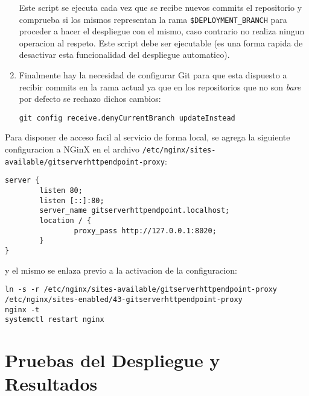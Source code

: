 \begin{enumerate}
\begin{lstlisting}[breaklines=true]
    \end{lstlisting}
    Este script se ejecuta cada vez que se recibe nuevos commits el repositorio y comprueba si los mismos representan la rama \texttt{\$DEPLOYMENT\_BRANCH} para proceder a hacer el despliegue con el mismo, caso contrario no realiza ningun operacion al respeto. Este script debe ser ejecutable (es una forma rapida de desactivar esta funcionalidad del despliegue automatico).
    \item Finalmente hay la necesidad de configurar Git para que esta dispuesto a recibir commits en la rama actual ya que en los repositorios que no son \textit{bare} por defecto se rechazo dichos cambios:
    \begin{lstlisting}
git config receive.denyCurrentBranch updateInstead
    \end{lstlisting}
\end{enumerate}

Para disponer de acceso facil al servicio de forma local, se agrega la siguiente configuracion a NGinX en el archivo \texttt{/etc/nginx/sites-available/gitserverhttpendpoint-proxy}:
\begin{lstlisting}
server {
        listen 80;
        listen [::]:80;
        server_name gitserverhttpendpoint.localhost;
        location / {
                proxy_pass http://127.0.0.1:8020;
        }
}
\end{lstlisting}
y el mismo se enlaza previo a la activacion de la configuracion:
\begin{lstlisting}[breaklines=true]
ln -s -r /etc/nginx/sites-available/gitserverhttpendpoint-proxy /etc/nginx/sites-enabled/43-gitserverhttpendpoint-proxy
nginx -t
systemctl restart nginx
\end{lstlisting}

\section{Pruebas del Despliegue y Resultados}
